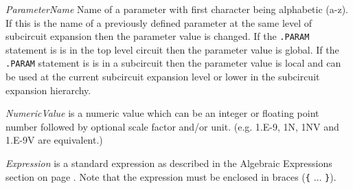 \begin{widelist}
\item[{\it ParameterName}] Name of a parameter with first character being
     alphabetic (a-z).
     If this is the name of a
     previously defined parameter at the same level of subcircuit expansion
     then the parameter value is changed.
     If the {\tt .PARAM} statement is
     is in the top level circuit then the parameter value is global.
     If the {\tt .PARAM} statement is
     is in a subcircuit then the parameter value is local and can be used at
     the current subcircuit expansion level or lower in the subcircuit
     expansion hierarchy.

\item[{\it NumericValue}] is a numeric value which can be an integer or
     floating point number followed by optional scale factor and/or unit.
     (e.g. 1.E-9, 1N, 1NV and 1.E-9V are equivalent.)

\item[{\it Expression}] is a standard expression as described in the Algebraic
Expressions section on page \pageref{section:algebraic:expression}.
     Note that the expression must be enclosed in braces
     ({\tt \{} $\ldots$ {\tt \}}).

\end{widelist}

{}

